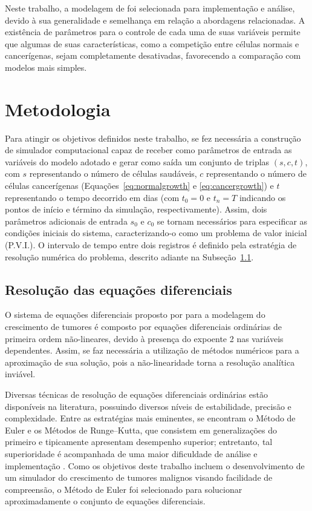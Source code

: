 \documentclass[12pt]{article}
\begin{document}
Neste trabalho, a modelagem de \cite{Panetta1996} foi selecionada para implementação e análise, devido à sua generalidade e semelhança em relação a abordagens relacionadas. A existência de parâmetros para o controle de cada uma de suas variáveis permite que algumas de suas características, como a competição entre células normais e cancerígenas, sejam completamente desativadas, favorecendo a comparação com modelos mais simples.

\section{Metodologia} \label{sec:methodology} %

Para atingir os objetivos definidos neste trabalho, se fez necessária a construção de simulador computacional capaz de receber como parâmetros de entrada as variáveis do modelo adotado e gerar como saída um conjunto de triplas $(s, c, t)$, com $s$ representando o número de células saudáveis, $c$ representando o número de células cancerígenas (Equações~\ref{eq:normalgrowth} e \ref{eq:cancergrowth}) e $t$ representando o tempo decorrido em dias (com $t_{0} = 0$ e $t_{n} = T$ indicando os pontos de início e término da simulação, respectivamente). Assim, dois parâmetros adicionais de entrada $s_{0}$ e $c_{0}$ se tornam necessários para especificar as condições iniciais do sistema, caracterizando-o como um problema de valor inicial (P.V.I.). O intervalo de tempo entre dois registros é definido pela estratégia de resolução numérica do problema, descrito adiante na Subseção~\ref{sec:numerical}.

\subsection{Resolução das equações diferenciais} \label{sec:numerical}

O sistema de equações diferenciais proposto por \cite{Panetta1996} para a modelagem do crescimento de tumores é composto por equações diferenciais ordinárias de primeira ordem não-lineares, devido à presença do expoente 2 nas variáveis dependentes. Assim, se faz necessária a utilização de métodos numéricos para a aproximação de sua solução, pois a não-linearidade torna a resolução analítica inviável.

Diversas técnicas de resolução de equações diferenciais ordinárias estão disponíveis na literatura, possuindo diversos níveis de estabilidade, precisão e complexidade. Entre as estratégias mais eminentes, se encontram o Método de Euler e os Métodos de Runge--Kutta, que consistem em generalizações do primeiro e tipicamente apresentam desempenho superior; entretanto, tal superioridade é acompanhada de uma maior dificuldade de análise e implementação \cite{Butcher2016}. Como os objetivos deste trabalho incluem o desenvolvimento de um simulador do crescimento de tumores malignos visando facilidade de compreensão, o Método de Euler foi selecionado para solucionar aproximadamente o conjunto de equações diferenciais.
\end{document}
